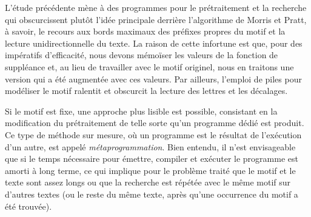 \vspace*{-10pt}


L'étude précédente mène à des programmes pour le prétraitement et la
recherche qui obscurcissent plutôt l'idée principale derrière
l'algorithme de Morris et Pratt, à savoir, le recours aux bords
maximaux des préfixes propres du motif et la lecture unidirectionnelle
du texte. La raison de cette infortune est que, pour des impératifs
d'efficacité, nous devons mémoïser les valeurs de
la fonction de suppléance et, au lieu de travailler avec le motif
originel, nous en traitons une version qui a été augmentée avec ces
valeurs. Par ailleurs, l'emploi de piles pour modéliser le motif
ralentit et obscurcit la lecture des lettres et les décalages.

Si le motif est fixe, une approche plus lisible est possible,
consistant en la modification du prétraitement de telle sorte qu'un
programme dédié est produit. Ce type de méthode sur mesure, où un
programme est le résultat de l'exécution d'un autre, est appelé
\emph{métaprogrammation}. Bien entendu, il
n'est envisageable que si le temps nécessaire pour émettre, compiler
et exécuter le programme est amorti à long terme, ce qui implique pour
le problème traité que le motif et le texte sont assez longs ou que la
recherche est répétée avec le même motif sur d'autres textes (ou le
reste du même texte, après qu'une occurrence du motif a été trouvée).

